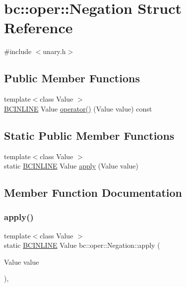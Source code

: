 \hypertarget{structbc_1_1oper_1_1Negation}{}\section{bc\+:\+:oper\+:\+:Negation Struct Reference}
\label{structbc_1_1oper_1_1Negation}


{\ttfamily \#include $<$unary.\+h$>$}

\subsection*{Public Member Functions}
\begin{DoxyCompactItemize}
\item 
{\footnotesize template$<$class Value $>$ }\\\hyperlink{common_8h_a6699e8b0449da5c0fafb878e59c1d4b1}{B\+C\+I\+N\+L\+I\+NE} Value \hyperlink{structbc_1_1oper_1_1Negation_aa1e7024b5a8b85dd21d28118fc4ac40c}{operator()} (Value value) const
\end{DoxyCompactItemize}
\subsection*{Static Public Member Functions}
\begin{DoxyCompactItemize}
\item 
{\footnotesize template$<$class Value $>$ }\\static \hyperlink{common_8h_a6699e8b0449da5c0fafb878e59c1d4b1}{B\+C\+I\+N\+L\+I\+NE} Value \hyperlink{structbc_1_1oper_1_1Negation_add4d8e1b59561490f64209380f9d2549}{apply} (Value value)
\end{DoxyCompactItemize}


\subsection{Member Function Documentation}
\mbox{\label{structbc_1_1oper_1_1Negation_add4d8e1b59561490f64209380f9d2549}} 
\subsubsection{\texorpdfstring{apply()}{apply()}}
{\footnotesize\ttfamily template$<$class Value $>$ \\
static \hyperlink{common_8h_a6699e8b0449da5c0fafb878e59c1d4b1}{B\+C\+I\+N\+L\+I\+NE} Value bc\+::oper\+::\+Negation\+::apply (\begin{DoxyParamCaption}\item[{Value}]{value }\end{DoxyParamCaption})\hspace{0.3cm}{\ttfamily [inline]}, {\ttfamily [static]}}

